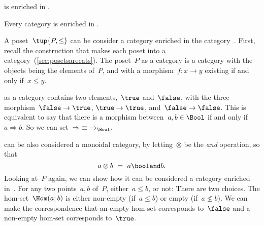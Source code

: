 {%
%

    \begin{example}
        \Category is enriched in \Category.
    \end{example}

    \begin{example}
        Every category is enriched in \Set.
    \end{example}


    \begin{example}
        A poset~$\tup{P, \leq}$ can be consider a category enriched in the
        category~\Bool. First, recall the construction that makes each poset into a
        category~(\cref{sec:posetsarecats}). The poset~$P$ as a category is a category with the objects being the
        elements of~$P$, and with a morphism~$f\colon x \to y$ existing if and only if~$x\leq y$.

        \Bool as a category contains two elements,~$\true$ and~$\false$, with
        the three morphism~$\false \to \true$, $\true \to \true$, and~$\false \to \false$. This is equivalent to say that there is a morphism between~$a, b \in \Bool$ if and only if~$a \Rightarrow b$. So we can set~$\Rightarrow\ \equiv\ \to_{\Bool}$.

        \Bool can be also considered a monoidal category, by letting~$\otimes$ be
        the \emph{and} operation, so that
        \begin{equation}
            a \otimes b\ =\ a \booland b.
        \end{equation}
        Looking at~$P$ again, we can show how it can be considered a category enriched in~\Bool. For any two points~$a, b$ of~$P$, either~$a \leq b$, or not: There are two choices. The hom-set~$\Hom(a; b)$ is either non-empty
        (if~$a \leq b$) or empty (if~$a \not\leq b$). We can make the correspondence that an empty hom-set corresponds to~$\false$ and a non-empty hom-set corresponds to~$\true$.


\end{example}}
